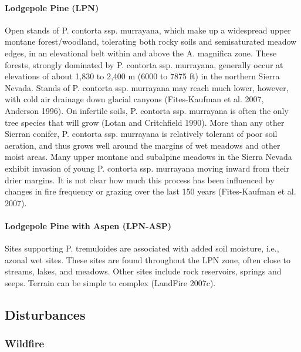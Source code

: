 \paragraph{Lodgepole Pine (LPN)}	Open stands of P. contorta ssp. murrayana, which make up a widespread upper montane forest/woodland, tolerating both rocky soils and semisaturated meadow edges, in an elevational belt within and above the A. magnifica zone. These forests, strongly dominated by P. contorta ssp. murrayana, generally occur at elevations of about 1,830 to 2,400 m (6000 to 7875 ft) in the northern Sierra Nevada. Stands of P. contorta ssp. murrayana may reach much lower, however, with cold air drainage down glacial canyons (Fites-Kaufman et al. 2007, Anderson 1996). On infertile soils, P. contorta ssp. murrayana is often the only tree species that will grow (Lotan and Critchfield 1990).
More than any other Sierran conifer, P. contorta ssp. murrayana is relatively tolerant of poor soil aeration, and thus grows well around the margins of wet meadows and other moist areas. Many upper montane and subalpine meadows in the Sierra Nevada exhibit invasion of young P. contorta ssp. murrayana moving inward from their drier margins. It is not clear how much this process has been influenced by changes in fire frequency or grazing over the last 150 years (Fites-Kaufman et al. 2007).

\paragraph{Lodgepole Pine with Aspen (LPN-ASP)}		Sites supporting P. tremuloides are associated with added soil moisture, i.e., azonal wet sites. These sites are found throughout the LPN zone, often close to streams, lakes, and meadows. Other sites include rock reservoirs, springs and seeps. Terrain can be simple to complex (LandFire 2007c). 


\subsection{Disturbances}

\subsubsection{Wildfire}

